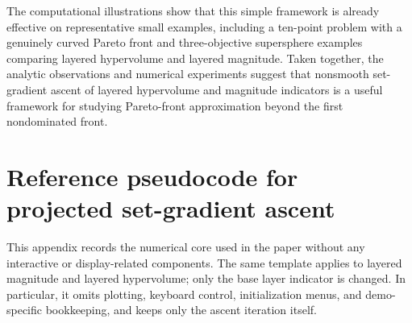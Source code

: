 \documentclass{article}
\begin{document}
The computational illustrations show that this simple framework is already effective on representative small examples, including a ten-point problem with a genuinely curved Pareto front and three-objective supersphere examples comparing layered hypervolume and layered magnitude.  Taken together, the analytic observations and numerical experiments suggest that nonsmooth set-gradient ascent of layered hypervolume and magnitude indicators is a useful framework for studying Pareto-front approximation beyond the first nondominated front.


\appendix

\section{Reference pseudocode for projected set-gradient ascent}
\label{app:algorithm}

This appendix records the numerical core used in the paper without any interactive or display-related components.  The same template applies to layered magnitude and layered hypervolume; only the base layer indicator is changed. In particular, it omits plotting, keyboard control, initialization menus, and demo-specific bookkeeping, and keeps only the ascent iteration itself.
\end{document}
